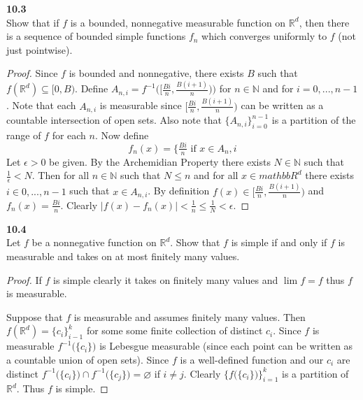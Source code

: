 \documentclass[12pt]{article}
\newcommand{\problem}[1]{\hspace{-4 ex} \large \textbf{#1}\\}
\let\emptyset\varnothing
\begin{document}
\problem{10.3} Show that if $f$ is a bounded, nonnegative measurable function on $\mathbb{R}^d$, then there is a sequence of bounded simple functions $f_n$ which converges uniformly to $f$ (not just pointwise).

	\begin{proof}
		Since $f$ is bounded and nonnegative, there exists $B$ such that \\$f(\mathbb{R}^d) \subseteq [0,B)$. Define $A_{n,i} = f^{-1}\Big( \big[\tfrac{Bi}{n}, \tfrac{B(i+1)}{n}\big)\Big)$ for $n \in \mathbb{N}$ and for $i=0,...,n-1$. Note that each $A_{n,i}$ is measurable since $\big[\tfrac{Bi}{n}, \tfrac{B(i+1)}{n}\big)$ can be written as a countable intersection of open sets. Also note that $\{A_{n,i}\}_{i=0}^{n-1}$ is a partition of the range of $f$ for each $n$. Now define 
		$$f_n(x) = \Big\{\tfrac{Bi}{n} \text{ if }x\in A_n,i$$
		Let $\epsilon > 0$ be given. By the Archemidian Property there exists $N \in \mathbb{N}$ such that $\tfrac{1}{\epsilon} < N$. Then for all $n\in \mathbb{N}$ such that $N \leq n$ and for all $x \in mathbb{R}^d$ there exists $i \in {0,...,n-1}$ such that $x \in A_{n,i}$. By definition $f(x) \in \big[\tfrac{Bi}{n}, \tfrac{B(i+1)}{n}\big)$ and $f_n(x) = \tfrac{Bi}{n}$. Clearly
		$\vert f(x) - f_n(x) \vert < \tfrac{1}{n} \leq \tfrac{1}{N} < \epsilon$.
	\end{proof}

\problem{10.4} Let $f$ be a nonnegative function on $\mathbb{R}^d$. Show that $f$ is simple if and only if $f$ is measurable and takes on at most finitely many values.

	\begin{proof}
		If $f$ is simple clearly it takes on finitely many values and $\lim f = f$ thus $f$ is measurable. \bigbreak
		
		Suppose that $f$ is measurable and assumes finitely many values. 
		Then $f(\mathbb{R}^d) = \{c_i\}_{i-1}^k$ for some some finite collection of distinct $c_i$. 
		Since $f$ is measurable $f^{-1}\big(\{c_i\}\big)$ is Lebesgue measurable (since each point can be written as a countable union of open sets). 
		Since $f$ is a well-defined function and our $c_i$ are distinct $f^{-1}\big(\{c_i\}\big) \cap f^{-1}\big(\{c_j\}\big) = \emptyset $ if $i \neq j$.
		Clearly $\Big \{f \big(\{c_i\} \big) \Big\}_{i=1}^k$ is a partition of $\mathbb{R}^d$. Thus $f$ is simple. 
	\end{proof}
\end{document}

